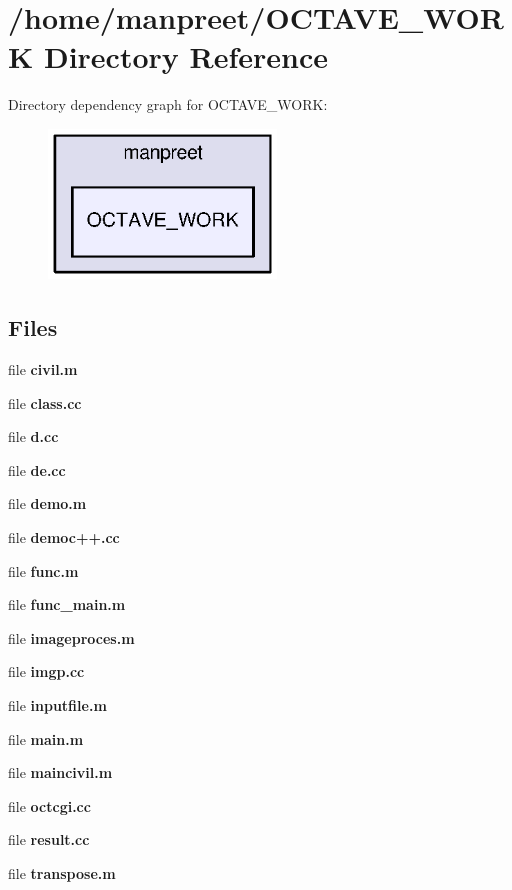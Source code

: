 \section{/home/manpreet/\-O\-C\-T\-A\-V\-E\-\_\-\-W\-O\-R\-K Directory Reference}
\label{dir_6874b91f18f4e740547fb4789fcacfa3}
Directory dependency graph for O\-C\-T\-A\-V\-E\-\_\-\-W\-O\-R\-K\-:\nopagebreak
\begin{figure}[H]
\begin{center}
\leavevmode
\includegraphics[width=172pt]{dir_6874b91f18f4e740547fb4789fcacfa3_dep}
\end{center}
\end{figure}
\subsection*{Files}
\begin{DoxyCompactItemize}
\item 
file {\bf civil.\-m}
\item 
file {\bf class.\-cc}
\item 
file {\bf d.\-cc}
\item 
file {\bf de.\-cc}
\item 
file {\bf demo.\-m}
\item 
file {\bf democ++.\-cc}
\item 
file {\bf func.\-m}
\item 
file {\bf func\-\_\-main.\-m}
\item 
file {\bf imageproces.\-m}
\item 
file {\bf imgp.\-cc}
\item 
file {\bf inputfile.\-m}
\item 
file {\bf main.\-m}
\item 
file {\bf maincivil.\-m}
\item 
file {\bf octcgi.\-cc}
\item 
file {\bf result.\-cc}
\item 
file {\bf transpose.\-m}
\end{DoxyCompactItemize}
